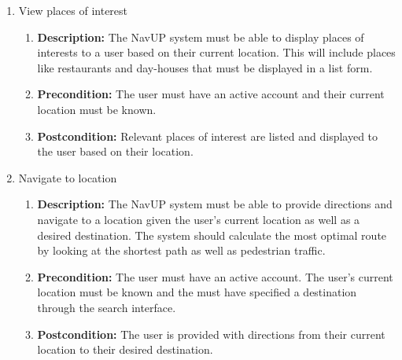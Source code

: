 \documentclass{article}
\begin{document}
\begin{enumerate}
\begin{enumerate}
		\item View places of interest
		\begin{enumerate}
			\item \textbf{Description:} The NavUP system must be able to display places of interests to a user based on their current location. This will include places like restaurants and day-houses that must be displayed in a list form. 
			\item \textbf{Precondition:} The user must have an active account and their current location must be known.  
			\item \textbf{Postcondition:} Relevant places of interest are listed and displayed to the user based on their location.\newline
		\end{enumerate}
		
		\item Navigate to location
		\begin{enumerate}
			\item \textbf{Description:} The NavUP system must be able to provide directions and navigate to a location given the user’s current location as well as a desired destination. The system should calculate the most optimal route by looking at the shortest path as well as pedestrian traffic.
			\item \textbf{Precondition:} The user must have an active account. The user’s current location must be known and the must have specified a destination through the search interface.
			\item \textbf{Postcondition:} The user is provided with directions from their current location to their desired destination.\newline
		\end{enumerate}
		

\end{enumerate}
\end{enumerate}
\end{document}
